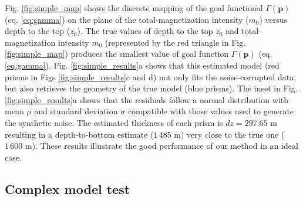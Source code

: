 Fig. \ref{fig:simple_map} shows the discrete mapping of the goal functional $ \Gamma(\mathbf{p}) $ (eq. \ref{eq:gamma}) on the plane of the total-magnetization intensity ($ m_0 $) versus depth to the top ($ z_0 $). The true values of depth to the top $ z_0 $ and total-magnetization intensity $ m_0 $ (represented by the red triangle in Fig. \ref{fig:simple_map}) produces the smallest value of goal function  $ \Gamma(\mathbf{p}) $ (eq. \ref{eq:gamma}). Fig. \ref{fig:simple_results}a shows that this estimated model (red prisms in Figs \ref{fig:simple_results}c and d) not only fits the noise-corrupted data, but also retrieves the geometry of the true model (blue prisms). The inset in Fig. \ref{fig:simple_results}a shows that the residuals follow a normal distribution with mean $ \mu $ and standard deviation $ \sigma $ compatible with those values used to generate the synthetic noise. The estimated thickness of each prism is $ dz = 297.65 $ m resulting in a depth-to-bottom estimate ($ 1\,485$ m) very close to the true one ($ 1\,600 $ m). 
These results illustrate the good performance of our method in an ideal case.

\subsection{Complex model test}

